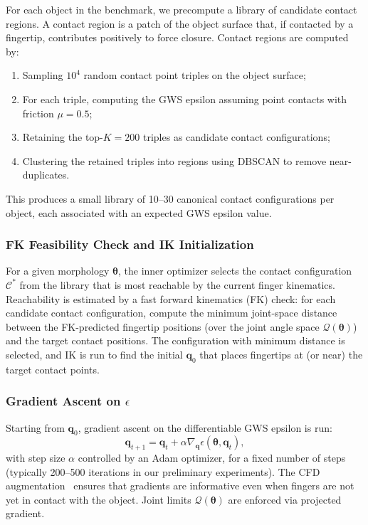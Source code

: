 \documentclass[journal]{IEEEtran}
\newcommand{\btheta}{\boldsymbol{\theta}}
\newcommand{\bq}{\mathbf{q}}
\newcommand{\cQ}{\mathcal{Q}}
\newcommand{\eps}{\epsilon}
\begin{document}
For each object in the benchmark, we precompute a library of candidate contact regions.
A contact region is a patch of the object surface that, if contacted by a fingertip,
contributes positively to force closure.
Contact regions are computed by:
\begin{enumerate}
  \item Sampling $10^4$ random contact point triples on the object surface;
  \item For each triple, computing the GWS epsilon assuming point contacts with friction
    $\mu = 0.5$;
  \item Retaining the top-$K = 200$ triples as candidate contact configurations;
  \item Clustering the retained triples into regions using DBSCAN to remove near-duplicates.
\end{enumerate}
This produces a small library of 10--30 canonical contact configurations per object,
each associated with an expected GWS epsilon value.

\subsubsection{FK Feasibility Check and IK Initialization}

For a given morphology $\btheta$, the inner optimizer selects the contact configuration
$\mathcal{C}^*$ from the library that is most reachable by the current finger kinematics.
Reachability is estimated by a fast forward kinematics (FK) check: for each candidate
contact configuration, compute the minimum joint-space distance between the FK-predicted
fingertip positions (over the joint angle space $\cQ(\btheta)$) and the target contact
positions.
The configuration with minimum distance is selected, and IK is run to find the initial
$\bq_0$ that places fingertips at (or near) the target contact points.

\subsubsection{Gradient Ascent on $\eps$}

Starting from $\bq_0$, gradient ascent on the differentiable GWS epsilon is run:
\begin{equation}
  \bq_{t+1} = \bq_t + \alpha \nabla_{\bq} \eps(\btheta, \bq_t),
  \label{eq:gradascent}
\end{equation}
with step size $\alpha$ controlled by an Adam optimizer, for a fixed number of steps
(typically 200--500 iterations in our preliminary experiments).
The CFD augmentation~\cite{diffmjx2025} ensures that gradients are informative even
when fingers are not yet in contact with the object.
Joint limits $\cQ(\btheta)$ are enforced via projected gradient.
\end{document}

